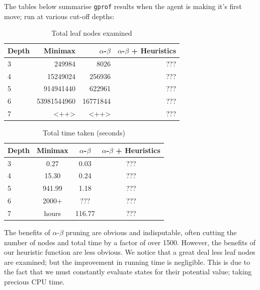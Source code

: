 \documentclass[10pt,twocolumn]{article}
\begin{document}
The tables below summarise \texttt{gprof} results when the agent is making it's first move;
run at various cut-off depths:
\begin{table}[H]
  \centering
  \caption{Total leaf nodes examined}
  \begin{tabular}{lrrr}
    \toprule
    Depth & Minimax & $\alpha$-$\beta$ & $\alpha$-$\beta$ + Heuristics \\
    \midrule
    3 & 249984 & 8026 & ??? \\
    4 & 15249024 & 256936 & ??? \\
    5 & 914941440 & 622961 & ??? \\
    6 & 53981544960 & 16771844 & ??? \\
    7 & <++> & <++> & ??? \\
    \bottomrule
  \end{tabular}
  \label{tab:leafnodes}
\end{table}
\begin{table}[h]
  \centering
  \caption{Total time taken (seconds)}
  \begin{tabular}{lccc}
    \toprule
    Depth & Minimax & $\alpha$-$\beta$ & $\alpha$-$\beta$ + Heuristics \\
    \midrule
    3 & 0.27 & 0.03 & ??? \\
    4 & 15.30 & 0.24 & ??? \\
    5 & 941.99 & 1.18 & ??? \\
    6 & 2000+ & ??? & ??? \\
    7 & hours & 116.77 & ??? \\
    \bottomrule
  \end{tabular}
  \label{tab:time}
\end{table}


The benefits of $\alpha$-$\beta$ pruning are obvious and indisputable, often cutting
the number of nodes and total time by a factor of over 1500.
However, the benefits of our heuristic function are less obvious. We notice that
a great deal less leaf nodes are examined; but the improvement in running time is
negligible. This is due to the fact that we must constantly evaluate states for their
potential value; taking precious CPU time.
\end{document}
